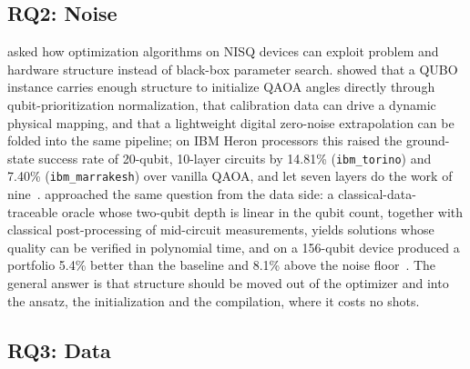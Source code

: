 \subsection{RQ2: Noise}\label{sec:conclusion:rq2}

 asked how optimization algorithms on NISQ devices can exploit problem and hardware structure instead of black-box parameter search. \deal{} showed that a QUBO instance carries enough structure to initialize QAOA angles directly through qubit-prioritization normalization, that calibration data can drive a dynamic physical mapping, and that a lightweight digital zero-noise extrapolation can be folded into the same pipeline; on IBM Heron processors this raised the ground-state success rate of 20-qubit, 10-layer circuits by 14.81\% (\texttt{ibm\_torino}) and 7.40\% (\texttt{ibm\_marrakesh}) over vanilla QAOA, and let seven layers do the work of nine~\cite{guo2025deal}. \qawa{} approached the same question from the data side: a classical-data-traceable oracle whose two-qubit depth is linear in the qubit count, together with classical post-processing of mid-circuit measurements, yields solutions whose quality can be verified in polynomial time, and on a 156-qubit device produced a portfolio 5.4\% better than the baseline and 8.1\% above the noise floor~\cite{guo2025qawa}. The general answer is that structure should be moved out of the optimizer and into the ansatz, the initialization and the compilation, where it costs no shots.

\subsection{RQ3: Data}\label{sec:conclusion:rq3}

